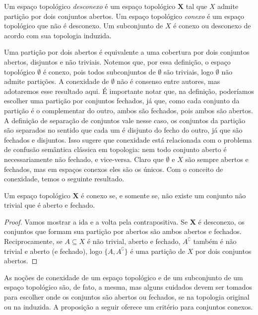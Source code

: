 \begin{definition}
Um espaço topológico \emph{desconexo} é um espaço topológico $\bm X$ tal que $X$ admite partição por dois conjuntos abertos. Um espaço topológico \emph{conexo} é um espaço topológico que não é desconexo. Um subconjunto de $X$ é conexo ou desconexo de acordo com sua topologia induzida.
\end{definition}

Uma partição por dois abertos é equivalente a uma cobertura por dois conjuntos abertos, disjuntos e não triviais. Notemos que, por essa definição, o espaço topológico $\bm \emptyset$ é conexo, pois todos subconjuntos de $\emptyset$ são triviais, logo $\emptyset$ não admite partições. A conexidade de $\emptyset$ não é consenso entre autores, mas adotaremos esse resultado aqui. É importante notar que, na definição, poderíamos escolher uma partição por conjuntos fechados, já que, como cada conjunto da partição é o complementar do outro, ambos são fechados, pois ambos são abertos. A definição de separação de conjuntos vale nesse caso, os conjuntos da partição são separados no sentido que cada um é disjunto do fecho do outro, já que são fechados e disjuntos. Isso sugere que conexidade está relacionada com o problema de confusão semântica clássica em topologia: nem todo conjunto aberto é necessariamente não fechado, e vice-versa. Claro que $\emptyset$ e $X$ são sempre abertos e fechados, mas em espaços conexos eles são os únicos. Com o conceito de conexidade, temos o seguinte resultado.

\begin{proposition}
Um espaço topológico $\bm X$ é conexo se, e somente se, não existe um conjunto não trivial que é aberto e fechado.
\end{proposition}
\begin{proof}
Vamos mostrar a ida e a volta pela contrapositiva. Se $\bm X$ é desconexo, os conjuntos que formam sua partição por abertos são ambos abertos e fechados. Reciprocamente, se $A \subseteq X$ é não trivial, aberto e fechado, $A^\complement$ também é não trivial e aberto (e fechado), logo $\{A, A^\complement\}$ é uma partição de $X$ por dois conjuntos abertos.
\end{proof}

As noções de conexidade de um espaço topológico e de um subconjunto de um espaço topológico são, de fato, a mesma, mas alguns cuidados devem ser tomados para escolher onde os conjuntos são abertos ou fechados, se na topologia original ou na induzida. A proposição a seguir oferece um critério para conjuntos conexos.

